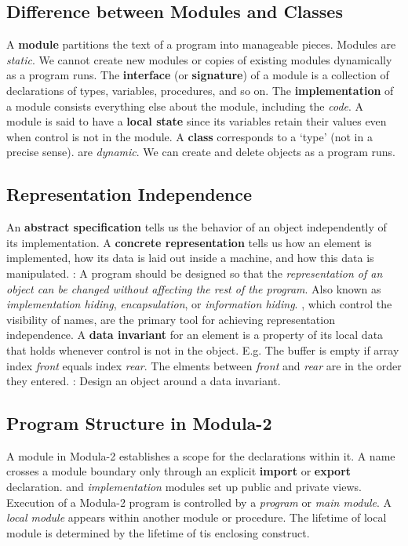 \documentclass{article}
\begin{document}
\subsection{Difference between Modules and Classes}
\bit
{}
\w A {\bf{}module} partitions the text of a program into manageable pieces.
	\bit
	\w Modules are {\em{}static\/}. We cannot create new modules or copies
		of existing modules dynamically as a program runs.
	\w The {\bf{}interface} (or {\bf{}signature}) of a module 
		is a collection of declarations of types, variables, 
		procedures, and so on.
	\w The {\bf{}implementation} of a module consists everything else
		about the module, including the {\em{}code\/}.
	\w A module is said to have a {\bf{}local state} since its
		variables retain their values
		even when control is not in the module.
	\eit
\w A {\bf{}class} corresponds to a `type' (not in a precise sense).
	\bit
	 are {\em{}dynamic\/}. We can create and delete
		objects as a program runs.
	\eit
\eit


\subsection{Representation Independence}
\bit
\w An {\bf{}abstract specification} tells us the behavior of an object
	independently of its implementation.
\w A {\bf{}concrete representation} tells us how an element is implemented,
	how its data is laid out inside a machine, and how this data is
	manipulated.
:
	\bit
	\w A program should be designed so that the {\em{}representation
		of an object can be changed without affecting the rest of
		the program\/}.
	\w Also known as {\em{}implementation hiding\/}, 
		{\em{}encapsulation\/}, or {\em{}information hiding\/}.	
	, which control the visibility of names,
		are the primary tool for achieving representation 
		independence.
	\eit
\w A {\bf{}data invariant} for an element is a property of its local
	data that holds whenever control is not in the object. E.g.
	\bit
	\w The buffer is empty if array index {\em{}front\/} equals index 
		{\em{}rear\/}.
	\w The elments between {\em{}front\/} and {\em{}rear\/} are in
		the order they entered.
	\eit
{}:
	\bit
	\w Design an object around a data invariant.
	\eit
\eit

\subsection{Program Structure in Modula-2}
\bit
\w A module in Modula-2 establishes a scope for the declarations within it.
	\bit
	\w A name crosses a module boundary only through an explicit
		{\bf{}import} or {\bf{}export} declaration.
	\eit
{} and {\em{}implementation\/} modules set up
	public and private views.
\w Execution of a Modula-2 program is controlled by a {\em{}program\/} or
	{\em{}main module\/}.
\w A {\em{}local module\/} appears within another module or procedure.
	\bit
	\w The lifetime of local module is determined by the lifetime
		of tis enclosing construct.
	\eit
\eit
\end{document}
